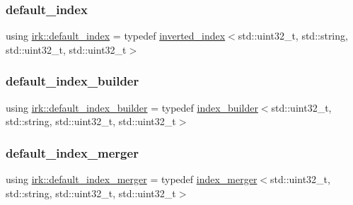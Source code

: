 \mbox{\label{namespaceirk_af6ee69596c3b148bdec81164443f37f8}} 
\subsubsection{\texorpdfstring{default\+\_\+index}{default\_index}}
{\footnotesize\ttfamily using \mbox{\hyperlink{namespaceirk_af6ee69596c3b148bdec81164443f37f8}{irk\+::default\+\_\+index}} = typedef \mbox{\hyperlink{classirk_1_1inverted__index}{inverted\+\_\+index}}$<$std\+::uint32\+\_\+t, std\+::string, std\+::uint32\+\_\+t, std\+::uint32\+\_\+t$>$}

\mbox{\label{namespaceirk_af1d86af53878a68d661f3e8ea2dc06b9}} 
\subsubsection{\texorpdfstring{default\+\_\+index\+\_\+builder}{default\_index\_builder}}
{\footnotesize\ttfamily using \mbox{\hyperlink{namespaceirk_af1d86af53878a68d661f3e8ea2dc06b9}{irk\+::default\+\_\+index\+\_\+builder}} = typedef \mbox{\hyperlink{classirk_1_1index__builder}{index\+\_\+builder}}$<$std\+::uint32\+\_\+t, std\+::string, std\+::uint32\+\_\+t, std\+::uint32\+\_\+t$>$}

\mbox{\label{namespaceirk_a1a0dd571a3774e966f9d89abe5d4c6ee}} 
\subsubsection{\texorpdfstring{default\+\_\+index\+\_\+merger}{default\_index\_merger}}
{\footnotesize\ttfamily using \mbox{\hyperlink{namespaceirk_a1a0dd571a3774e966f9d89abe5d4c6ee}{irk\+::default\+\_\+index\+\_\+merger}} = typedef \mbox{\hyperlink{classirk_1_1index__merger}{index\+\_\+merger}}$<$std\+::uint32\+\_\+t, std\+::string, std\+::uint32\+\_\+t, std\+::uint32\+\_\+t$>$}

\mbox{\label{namespaceirk_af5d95ec091f3bd711790e71ccb533903}} 
